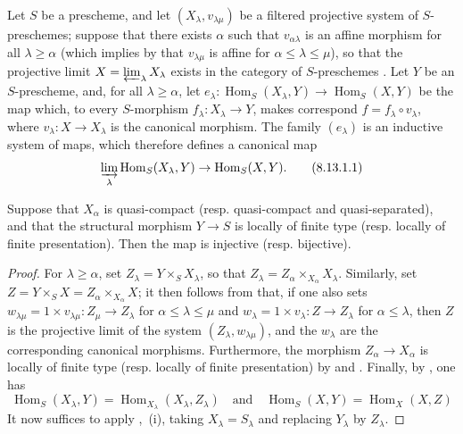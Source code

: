 \begin{proposition}[8.13.1]
\label{IV.8.13.1}
Let $S$ be a prescheme, and let $(X_\lambda,v_{\lambda\mu})$ be a filtered projective system of $S$-preschemes; suppose that there exists $\alpha$ such that $v_{\alpha\lambda}$ is an affine morphism for all $\lambda\geqslant\alpha$ (which implies by  that $v_{\lambda\mu}$ is affine for $\alpha\leqslant\lambda\leqslant\mu$), so that the projective limit $X=\varprojlim_\lambda X_\lambda$ exists in the category of $S$-preschemes .
Let $Y$ be an $S$-prescheme, and, for all $\lambda\geqslant\alpha$, let $e_\lambda:\operatorname{Hom}_S(X_\lambda,Y)\to\operatorname{Hom}_S(X,Y)$ be the map which, to every $S$-morphism $f_\lambda:X_\lambda\to Y$, makes correspond $f=f_\lambda\circ v_\lambda$, where $v_\lambda:X\to X_\lambda$ is the canonical morphism.
The family $(e_\lambda)$ is an inductive system of maps, which therefore defines a canonical map
\begin{equation}
\label{IV.8.13.1.1}
\varinjlim_\lambda\operatorname{Hom}_S(X_\lambda,Y)\to\operatorname{Hom}_S(X,Y). \tag{8.13.1.1}
\end{equation}

Suppose that $X_\alpha$ is quasi-compact (resp. quasi-compact and quasi-separated), and that the structural morphism $Y\to S$ is locally of finite type (resp. locally of finite presentation).
Then the map  is injective (resp. bijective).
\end{proposition}

\begin{proof}
For $\lambda\geqslant\alpha$, set $Z_\lambda=Y\times_S X_\lambda$, so that $Z_\lambda=Z_\alpha\times_{X_\alpha}X_\lambda$.
Similarly, set $Z=Y\times_S X=Z_\alpha\times_{X_\alpha}X$; it then follows from  that, if one also sets $w_{\lambda\mu}=1\times v_{\lambda\mu}:Z_\mu\to Z_\lambda$ for $\alpha\leqslant\lambda\leqslant\mu$ and $w_\lambda=1\times v_\lambda:Z\to Z_\lambda$ for $\alpha\leqslant\lambda$, then $Z$ is the projective limit of the system $(Z_\lambda,w_{\lambda\mu})$, and the $w_\lambda$ are the corresponding canonical morphisms.
Furthermore, the morphism $Z_\alpha\to X_\alpha$ is locally of finite type (resp. locally of finite presentation) by  and .
Finally, by , one has
\[
\operatorname{Hom}_S(X_\lambda,Y)=\operatorname{Hom}_{X_\lambda}(X_\lambda,Z_\lambda) \quad\text{and}\quad \operatorname{Hom}_S(X,Y)=\operatorname{Hom}_X(X,Z)
\]
It now suffices to apply ,~(i), taking $X_\lambda=S_\lambda$ and replacing $Y_\lambda$ by $Z_\lambda$.
\end{proof}

